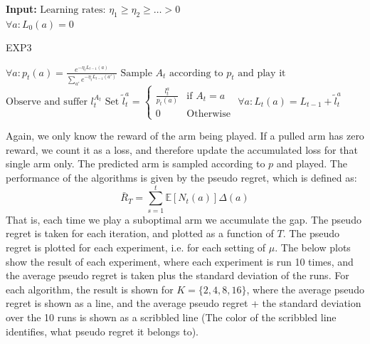 \documentclass{article}
\begin{document}
\begin{algorithm}[H]
\hspace*{\algorithmicindent}\textbf{Input:} $\text{Learning rates: } \eta_1 \geq \eta_2 \geq \dots > 0 $ \\
\hspace*{\algorithmicindent}$ \forall a : L_0 (a) = 0 $
\caption{EXP3}\label{euclid}
\begin{algorithmic}[1]
\State $\forall a : p_t(a) = \frac{ e^{-\eta_t L_{t-1}(a)} }{ \sum_{a'} e^{- \eta_t L_{t-1}(a') } } $
\State $\text{Sample } A_t \text{ according to } p_t \text{ and play it} $
\State $\text{Observe and suffer } l_t^{A_t} $
\State $ \text{Set } \tilde{l}_t^a = \begin{cases}
\frac{l_t^a}{p_t(a)} &\text{if $A_t = a$}\\
0 &\text{Otherwise}
\end{cases} $
\State $ \forall a : L_t(a) = L_{t-1} + \tilde{l}_t^a $
\EndFor
\end{algorithmic}
\end{algorithm}
Again, we only know the reward of the arm being played. If a pulled arm has zero reward, we count it as a loss, and therefore update the accumulated loss for that single arm only. The predicted arm is sampled according to $p$ and played. The performance of the algorithms is given by the pseudo regret, which is defined as:
\begin{equation}
\label{eq:pseudo}
\bar{R}_T = \sum_{s=1}^t \mathbb{E}\left[  N_t(a)  \right] \Delta(a)
\end{equation}
That is, each time we play a suboptimal arm we accumulate the gap. The pseudo regret is taken for each iteration, and plotted as a function of $T$. The pseudo regret is plotted for each experiment, i.e. for each setting of $\mu$. The below plots show the result of each experiment, where each experiment is run 10 times, and the average pseudo regret is taken plus the standard deviation of the runs. For each algorithm, the result is shown for $K = \lbrace 2,4,8,16  \rbrace$, where the average pseudo regret is shown as a line, and the average pseudo regret + the standard deviation over the 10 runs is shown as a scribbled line (The color of the scribbled line identifies, what pseudo regret it belongs to).
\end{document}
